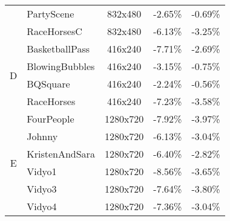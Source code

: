 \begin{table}[!p]
\begin{tabular}{@{}clccc@{}}
                                         & PartyScene                                & 832x480                 & -2.65\%                            & -0.69\%                    \\
                                         & RaceHorsesC                               & 832x480                 & -6.13\%                            & -3.25\%                    \\
        \multirow{4}{*}{D}               & BasketballPass                            & 416x240                 & -7.71\%                            & -2.69\%                    \\
                                         & BlowingBubbles                            & 416x240                 & -3.15\%                            & -0.75\%                    \\
                                         & BQSquare                                  & 416x240                 & -2.24\%                            & -0.56\%                    \\
                                         & RaceHorses                                & 416x240                 & -7.23\%                            & -3.58\%                    \\
        \multirow{6}{*}{E}               & FourPeople                                & 1280x720                & -7.92\%                            & -3.97\%                    \\
                                         & Johnny                                    & 1280x720                & -6.13\%                            & -3.04\%                    \\
                                         & KristenAndSara                            & 1280x720                & -6.40\%                            & -2.82\%                    \\
                                         & Vidyo1                                    & 1280x720                & -8.56\%                            & -3.65\%                    \\
                                         & Vidyo3                                    & 1280x720                & -7.64\%                            & -3.80\%                    \\
                                         & Vidyo4                                    & 1280x720                & -7.36\%                            & -3.04\%                    \\

\end{tabular}
\end{table}
